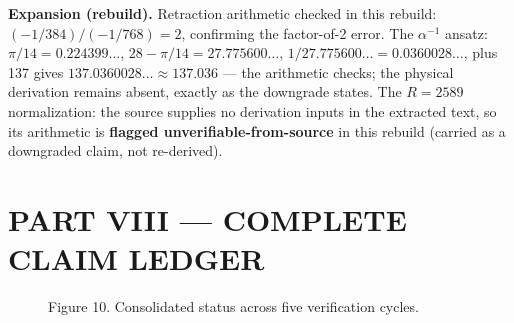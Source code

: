\documentclass[11pt,a4paper]{article}
\newcommand{\expansion}[1]{\par\smallskip\noindent\textbf{Expansion (rebuild).} #1\par\smallskip}
\begin{document}
\expansion{Retraction arithmetic checked in this rebuild: $(-1/384)/(-1/768) = 2$, confirming the factor-of-2 error. The $\alpha^{-1}$ ansatz: $\pi/14 = 0.224399\ldots$, $28 - \pi/14 = 27.775600\ldots$, $1/27.775600\ldots = 0.0360028\ldots$, plus 137 gives $137.0360028\ldots \approx 137.036$ --- the arithmetic checks; the physical derivation remains absent, exactly as the downgrade states. The $R = 2589$ normalization: the source supplies no derivation inputs in the extracted text, so its arithmetic is \textbf{flagged unverifiable-from-source} in this rebuild (carried as a downgraded claim, not re-derived).}

\section{PART VIII --- COMPLETE CLAIM LEDGER}
\begin{figure}[h]
\centering
{}
\caption{Figure 10. Consolidated status across five verification cycles.}
\end{figure}
\end{document}
